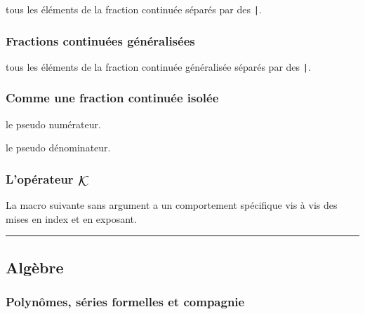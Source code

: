 \documentclass[12pt,a4paper]{article}
\theoremstyle{definition}
\newcommand\separation{
	\medskip
	\hfill\rule{0.5\textwidth}{0.75pt}\hfill
	\medskip
}
\newcommand\extraspace{
	\vspace{0.25em}
}
\begin{document}
\IDarg{} tous les éléments de la fraction continuée séparés par des \verb+|+.





\subsubsection{Fractions continuées généralisées}



\IDarg{} tous les éléments de la fraction continuée généralisée séparés par des \verb+|+.





\subsubsection{Comme une fraction continuée isolée}


 le pseudo numérateur.

 le pseudo dénominateur.





\subsubsection{\texorpdfstring{L'opérateur $\contfracope$}%
                          {L'opérateur K}}

La macro suivante sans argument a un comportement spécifique vis à vis des mises en index et en exposant. 


\separation


\subsection{Algèbre}

\subsubsection{Polynômes, séries formelles et compagnie}



\extraspace
\end{document}
